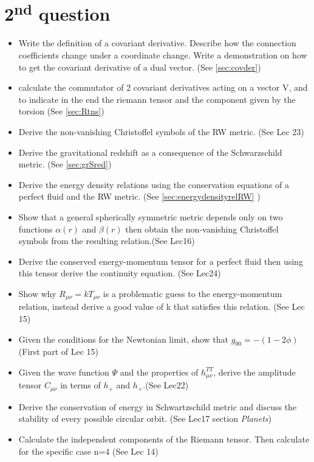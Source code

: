 \section{2\textsuperscript{nd} question}

\begin{itemize}
	\item Write the definition of a covariant derivative. Describe how the connection coefficients change under a coordinate change. Write a demonstration on how to get the covariant derivative of a dual vector. (See \ref{sec:covder})
	\item calculate the commutator of 2 covariant derivatives acting on a vector V, and to indicate in the end the riemann tensor and the component given by the torsion (See \ref{sec:Rtns})
	\item Derive the non-vanishing Christoffel symbols of the RW metric. (See Lec 23)
	\item Derive the gravitational redshift as a consequence of the Schwarzschild metric. (See \ref{sec:grSred})
	\item Derive the energy density relations using the conservation equations of a perfect fluid and the RW metric. (See \ref{sec:energydensityrelRW} )
\item Show that a general spherically symmetric metric depends only on two functions $\alpha \left( r \right)$ and $\beta \left( r \right)$ then obtain the non-vanishing Christoffel symbols from the resulting relation.(See Lec16)
\item Derive the conserved energy-momentum tensor for a perfect fluid then using this tensor derive the continuity equation. (See Lec24)
\item Show why $R_{\mu \nu } = k T_{\mu \nu }$ is a problematic guess to the energy-momentum relation, instead derive a good value of k that satisfies this relation. (See Lec 15)
\item Given the conditions for the Newtonian limit, show that $g_{00 } = - \left( 1-2\phi  \right) $ (First part of Lec 15)
\item Given the wave function $\Psi $ and the properties of $h^{TT}_{\mu \nu }$, derive the amplitude tensor $C_{\mu \nu }$ in terms of $h_{+}$ and $h_{\times}$.(See Lec22)
\item Derive the conservation of energy in Schwartzschild metric and discuss the stability of every possible circular orbit. (See Lec17 section \emph{Planets})
\item Calculate the independent components of the Riemann tensor. Then calculate for the specific case n=4 (See Lec 14)

\end{itemize}
